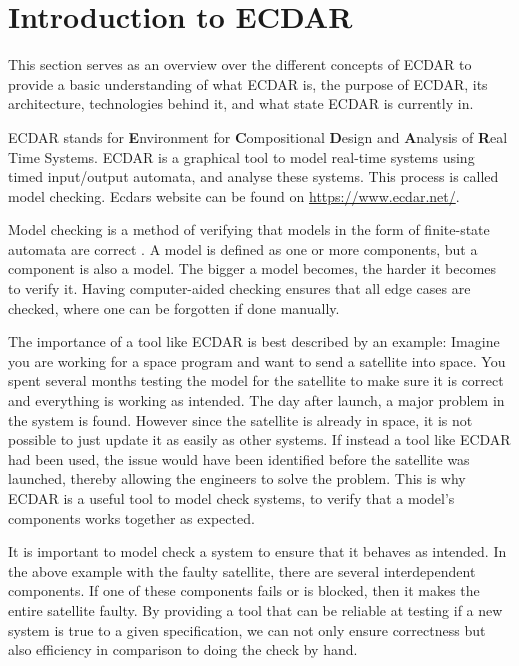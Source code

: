 \section{Introduction to ECDAR}\label{sec:introduction-to-ecdar}
\commondisclaimer

This section serves as an overview over the different concepts of ECDAR to provide a basic understanding of what ECDAR is, the purpose of ECDAR, its architecture, technologies behind it, and what state ECDAR is currently in.

ECDAR stands for \textbf{E}nvironment for \textbf{C}ompositional \textbf{D}esign and \textbf{A}nalysis of \textbf{R}eal Time Systems.
ECDAR is a graphical tool to model real-time systems using timed input/output automata, and analyse these systems. 
This process is called model checking. Ecdars website can be found on \href{https://www.ecdar.net/}{https://www.ecdar.net/}.

Model checking is a method of verifying that models in the form of finite-state automata are correct \cite{modelchecking-handbook}. A model is defined as one or more components, but a component is also a model.
The bigger a model becomes, the harder it becomes to verify it. 
Having computer-aided checking ensures that all edge cases are checked, where one can be forgotten if done manually.
 
The importance of a tool like ECDAR is best described by an example:
Imagine you are working for a space program and want to send a satellite into space.
You spent several months testing the model for the satellite to make sure it is correct and everything is working as intended.
The day after launch, a major problem in the system is found. However since the satellite is already in space, it is not possible to just update it as easily as other systems. If instead a tool like ECDAR had been used, the issue would have been identified before the satellite was launched, thereby allowing the engineers to solve the problem.
This is why ECDAR is a useful tool to model check systems, to verify that a model's components works together as expected.



It is important to model check a system to ensure that it behaves as intended.
In the above example with the faulty satellite, there are several interdependent components.
If one of these components fails or is blocked, then it makes the entire satellite faulty.
By providing a tool that can be reliable at testing if a new system is true to a given specification, we can not only ensure correctness but also efficiency in comparison to doing the check by hand.


